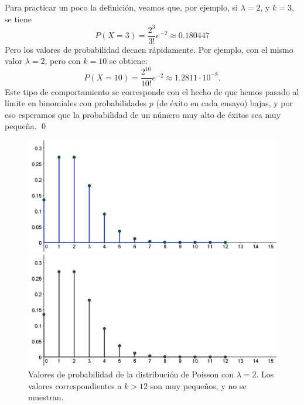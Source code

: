 \begin{ejemplo}
\label{cap08:ejem:Poisson01}
    Para practicar un poco la definición, veamos que, por ejemplo, si $\lambda=2$, y $k=3$, se tiene
        \[P(X=3)=\dfrac{2^3}{3!}e^{-2}\approx  0.180447\]
    Pero los valores de probabilidad decaen rápidamente. Por ejemplo, con el mismo valor $\lambda=2$, pero con $k=10$ se obtiene:
        \[P(X=10)=\dfrac{2^{10}}{10!}e^{-2}\approx 1.2811\cdot 10^{-8}.\]
    Este tipo de comportamiento se corresponde con el hecho de que hemos pasado al límite en binomiales con probabilidades $p$ (de éxito en cada ensayo) bajas, y por eso esperamos que la probabilidad de un número muy alto de éxitos sea muy pequeña.
    \qed
\end{ejemplo}

\begin{figure}[htbp]
\begin{center}
\begin{enColor}
\includegraphics[width=13cm]{../fig/Cap08-PoissonLambda2Probabilidades.png}
\end{enColor}
\begin{bn}
\includegraphics[width=13cm]{../fig/Cap08-PoissonLambda2Probabilidades-bn.png}
\end{bn}
\caption{Valores de probabilidad de la distribución de Poisson con $\lambda=2$. Los valores correspondientes a $k>12$ son muy pequeños, y no se muestran.}
\label{cap07:fig:PoissonLambda2Probabilidades}
\end{center}
\end{figure}

